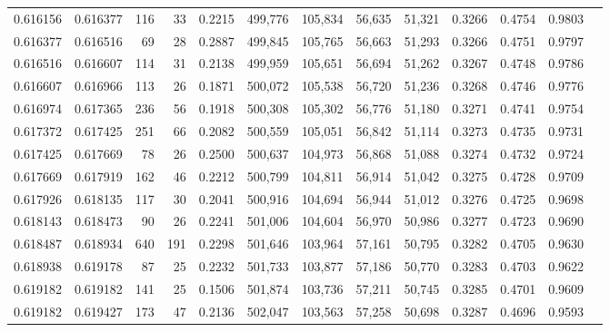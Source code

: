 \begin{tabular}{rrrrrrrrrrrrr}
0.616156 & 0.616377 &   116 &  33 &                                     0.2215 & 499,776 & 105,834 &  56,635 &  51,321 & 0.3266 & 0.4754 & 0.9803 \\
0.616377 & 0.616516 &    69 &  28 &                                     0.2887 & 499,845 & 105,765 &  56,663 &  51,293 & 0.3266 & 0.4751 & 0.9797 \\
0.616516 & 0.616607 &   114 &  31 &                                     0.2138 & 499,959 & 105,651 &  56,694 &  51,262 & 0.3267 & 0.4748 & 0.9786 \\
0.616607 & 0.616966 &   113 &  26 &                                     0.1871 & 500,072 & 105,538 &  56,720 &  51,236 & 0.3268 & 0.4746 & 0.9776 \\
0.616974 & 0.617365 &   236 &  56 &                                     0.1918 & 500,308 & 105,302 &  56,776 &  51,180 & 0.3271 & 0.4741 & 0.9754 \\
0.617372 & 0.617425 &   251 &  66 &                                     0.2082 & 500,559 & 105,051 &  56,842 &  51,114 & 0.3273 & 0.4735 & 0.9731 \\
0.617425 & 0.617669 &    78 &  26 &                                     0.2500 & 500,637 & 104,973 &  56,868 &  51,088 & 0.3274 & 0.4732 & 0.9724 \\
0.617669 & 0.617919 &   162 &  46 &                                     0.2212 & 500,799 & 104,811 &  56,914 &  51,042 & 0.3275 & 0.4728 & 0.9709 \\
0.617926 & 0.618135 &   117 &  30 &                                     0.2041 & 500,916 & 104,694 &  56,944 &  51,012 & 0.3276 & 0.4725 & 0.9698 \\
0.618143 & 0.618473 &    90 &  26 &                                     0.2241 & 501,006 & 104,604 &  56,970 &  50,986 & 0.3277 & 0.4723 & 0.9690 \\
0.618487 & 0.618934 &   640 & 191 &                                     0.2298 & 501,646 & 103,964 &  57,161 &  50,795 & 0.3282 & 0.4705 & 0.9630 \\
0.618938 & 0.619178 &    87 &  25 &                                     0.2232 & 501,733 & 103,877 &  57,186 &  50,770 & 0.3283 & 0.4703 & 0.9622 \\
0.619182 & 0.619182 &   141 &  25 &                                     0.1506 & 501,874 & 103,736 &  57,211 &  50,745 & 0.3285 & 0.4701 & 0.9609 \\
0.619182 & 0.619427 &   173 &  47 &                                     0.2136 & 502,047 & 103,563 &  57,258 &  50,698 & 0.3287 & 0.4696 & 0.9593 \\

\end{tabular}

